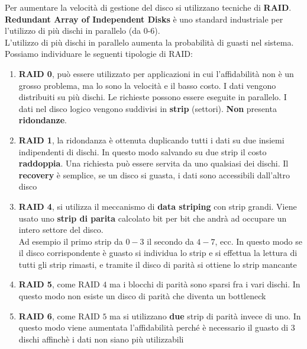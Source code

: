 \documentclass{article}
\begin{document}
Per aumentare la velocità di gestione del disco si utilizzano tecniche di \textbf{RAID}. \textbf{Redundant Array of Independent Disks} è uno standard industriale per l'utilizzo di più dischi in parallelo (da 0-6).\\
L'utilizzo di più dischi in parallelo aumenta la probabilità di guasti nel sistema. Possiamo individuare le seguenti tipologie di RAID:
\begin{enumerate}
  \item \textbf{RAID 0}, può essere utilizzato per applicazioni in cui l'affidabilità non è un grosso problema, ma lo sono la velocità e il basso costo. I dati vengono distribuiti su più dischi. Le richieste possono essere eseguite in parallelo. I dati nel disco logico vengono suddivisi in \textbf{strip} (settori). \textbf{Non} presenta \textbf{ridondanze}.
  \item \textbf{RAID 1}, la ridondanza è ottenuta duplicando tutti i dati su due insiemi indipendenti di dischi. In questo modo salvando su due strip il costo \textbf{raddoppia}. Una richiesta può essere servita da uno qualsiasi dei dischi. Il \textbf{recovery} è semplice, se un disco si guasta, i dati sono accessibili dall'altro disco
  \item \textbf{RAID 4}, si utilizza il meccanismo di \textbf{data striping} con strip grandi. Viene usato uno \textbf{strip di parita} calcolato bit per bit che andrà ad occupare un intero settore del disco.\\ Ad esempio il primo strip da $0-3$ il secondo da $4-7$, ecc. In questo modo se il disco corrispondente è guasto si individua lo strip e si effettua la lettura di tutti gli strip rimasti, e tramite il disco di parità si ottiene lo strip mancante
  \item \textbf{RAID 5}, come RAID $4$ ma i blocchi di parità sono sparsi fra i vari dischi. In questo modo non esiste un disco di parità che diventa un bottleneck
  \item \textbf{RAID 6}, come RAID $5$ ma si utilizzano \textbf{due} strip di parità invece di uno. In questo modo viene aumentata l'affidabilità perché è necessario il guasto di $3$ dischi affinchè i dati non siano più utilizzabili
\end{enumerate}

\newpage
\end{document}
